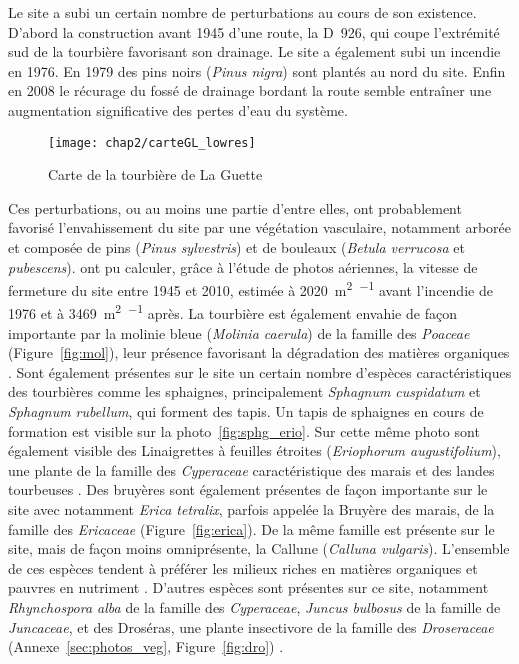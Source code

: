 Le site a subi un certain nombre de perturbations au cours de son existence.
D'abord la construction avant 1945 d'une route, la D~926, qui coupe l'extrémité sud de la tourbière favorisant son drainage.
Le site a également subi un incendie en 1976.
En 1979 des pins noirs (\textit{Pinus nigra}) sont plantés au nord du site.
Enfin en 2008 le récurage du fossé de drainage bordant la route semble entraîner une augmentation significative des pertes d'eau du système.

\begin{figure}
\texttt{[image: chap2/carteGL\_lowres]}
\caption{Carte de la tourbière de La Guette}
\label{fig:carte_LG}
\end{figure}

Ces perturbations, ou au moins une partie d'entre elles, ont probablement favorisé l'envahissement du site par une végétation vasculaire, notamment arborée et composée de pins (\textit{Pinus sylvestris}) et de bouleaux (\textit{Betula verrucosa} et \textit{pubescens}).
\citet{viel2015} ont pu calculer, grâce à l'étude de photos aériennes, la vitesse de fermeture du site entre 1945 et 2010, estimée à \SI{2020}{\square\metre\per\year} avant l'incendie de 1976 et à \SI{3469}{\square\metre\per\year} après.
La tourbière est également envahie de façon importante par la molinie bleue (\textit{Molinia caerula}) de la famille des \textit{Poaceae} (Figure~\ref{fig:mol}), leur présence favorisant la dégradation des matières organiques \citep{gogo2011}.
Sont également présentes sur le site un certain nombre d'espèces caractéristiques des tourbières comme les sphaignes, principalement \textit{Sphagnum cuspidatum} et \textit{Sphagnum rubellum}, qui forment des tapis.
Un tapis de sphaignes en cours de formation est visible sur la photo~\ref{fig:sphg_erio}.
Sur cette même photo sont également visible des Linaigrettes à feuilles étroites (\textit{Eriophorum augustifolium}), une plante de la famille des \textit{Cyperaceae} caractéristique des marais et des landes tourbeuses \citep{rameau2008}.
Des bruyères sont également présentes de façon importante sur le site avec notamment \textit{Erica tetralix}, parfois appelée la Bruyère des marais, de la famille des \textit{Ericaceae} (Figure~\ref{fig:erica}).
De la même famille est présente sur le site, mais de façon moins omniprésente, la Callune (\textit{Calluna vulgaris}).
L'ensemble de ces espèces tendent à préférer les milieux riches en matières organiques et pauvres en nutriment \citep{rameau2008}.
D'autres espèces sont présentes sur ce site, notamment \textit{Rhynchospora alba} de la famille des \textit{Cyperaceae}, \textit{Juncus bulbosus} de la famille de \textit{Juncaceae}, et des Droséras, une plante insectivore de la famille des \textit{Droseraceae} (Annexe~\ref{sec:photos_veg}, Figure~\ref{fig:dro}) . 

